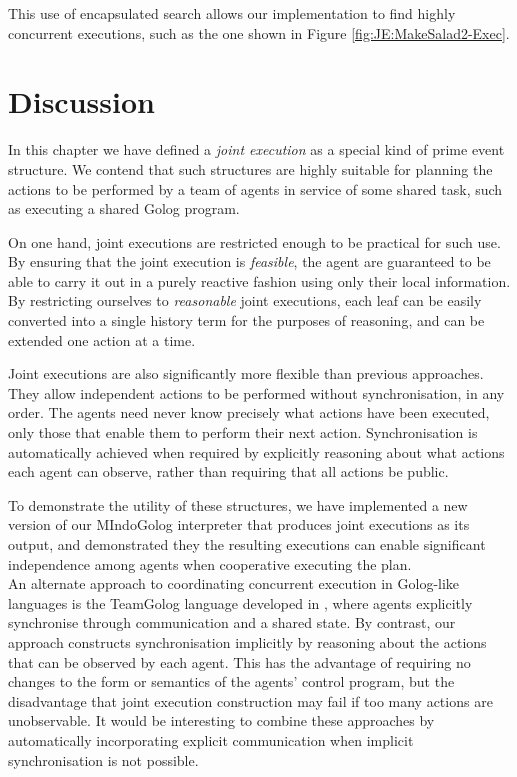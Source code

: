 
This use of encapsulated search allows our implementation to find
highly concurrent executions, such as the one shown in Figure \eqref{fig:JE:MakeSalad2-Exec}.


\section{Discussion\label{sec:JointExec:Discussion}}

In this chapter we have defined a \emph{joint execution} as a special
kind of prime event structure. We contend that such structures are
highly suitable for planning the actions to be performed by a team
of agents in service of some shared task, such as executing a shared
Golog program.

On one hand, joint executions are restricted enough to be practical
for such use. By ensuring that the joint execution is \emph{feasible},
the agent are guaranteed to be able to carry it out in a purely reactive
fashion using only their local information. By restricting ourselves
to \emph{reasonable }joint executions, each leaf can be easily converted
into a single history term for the purposes of reasoning, and can
be extended one action at a time.

Joint executions are also significantly more flexible than previous
approaches. They allow independent actions to be performed without
synchronisation, in any order. The agents need never know precisely
what actions have been executed, only those that enable them to perform
their next action. Synchronisation is automatically achieved when
required by explicitly reasoning about what actions each agent can
observe, rather than requiring that all actions be public.

To demonstrate the utility of these structures, we have implemented
a new version of our MIndoGolog interpreter that produces joint executions
as its output, and demonstrated they the resulting executions can
enable significant independence among agents when cooperative executing
the plan.\\


An alternate approach to coordinating concurrent execution in Golog-like
languages is the TeamGolog language developed in \citep{farinelli07team_golog},
where agents explicitly synchronise through communication and a shared
state. By contrast, our approach constructs synchronisation implicitly
by reasoning about the actions that can be observed by each agent.
This has the advantage of requiring no changes to the form or semantics
of the agents' control program, but the disadvantage that joint execution
construction may fail if too many actions are unobservable. It would
be interesting to combine these approaches by automatically incorporating
explicit communication when implicit synchronisation is not possible.

